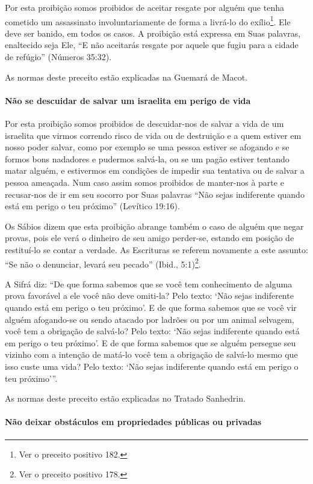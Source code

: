 Por esta proibição somos proibidos de aceitar resgate por alguém que
tenha cometido um assassinato involuntariamente de forma a livrá-lo do
exílio\footnote{Ver o preceito positivo 182.}. Ele deve ser banido, em todos os casos. A
proibição está expressa em Suas palavras, enaltecido seja Ele, ``E não
aceitarás resgate por aquele que fugiu para a cidade de refúgio''
(Números 35:32).

As normas deste preceito estão explicadas na Guemará de Macot.

\paragraph{Não se descuidar de salvar um israelita em perigo de vida}

Por esta proibição somos proibidos de descuidar-nos de salvar a vida de
um israelita que virmos correndo risco de vida ou de destruição e a quem
estiver em nosso poder salvar, como por exemplo se uma pessoa estiver se
afogando e se formos bons nadadores e pudermos salvá-la, ou se um pagão
estiver tentando matar alguém, e estivermos em condições de impedir sua
tentativa ou de salvar a pessoa ameaçada. Num caso assim somos proibidos
de manter-nos à parte e recusar-nos de ir em seu socorro por Suas
palavras ``Não sejas indiferente quando está em perigo o teu próximo''
(Levítico 19:16).

Os Sábios dizem que esta proibição abrange também o caso de alguém que
negar provas, pois ele verá o dinheiro de seu amigo perder-se, estando
em posição de restituí-lo se contar a verdade. As Escrituras se referem
novamente a este assunto: ``Se não o denunciar, levará seu pecado''
(Ibid., 5:1)\footnote{Ver o preceito positivo 178.}.

A Sifrá diz: ``De que forma sabemos que se você tem conhecimento de
alguma prova favorável a ele você não deve omiti-la? Pelo texto: `Não
sejas indiferente quando está em perigo o teu próximo'. E de que forma
sabemos que se você vir alguém afogando-se ou sendo atacado por ladrões
ou por um animal selvagem, você tem a obrigação de salvá-lo? Pelo texto:
`Não sejas indiferente quando está em perigo o teu próximo'. E de que
forma sabemos que se alguém persegue seu vizinho com a intenção de
matá-lo você tem a obrigação de salvá-lo mesmo que isso custe uma vida?
Pelo texto: `Não sejas indiferente quando está em perigo o teu
próximo'''.

As normas deste preceito estão explicadas no Tratado Sanhedrin.

\paragraph{Não deixar obstáculos em propriedades públicas ou privadas}

